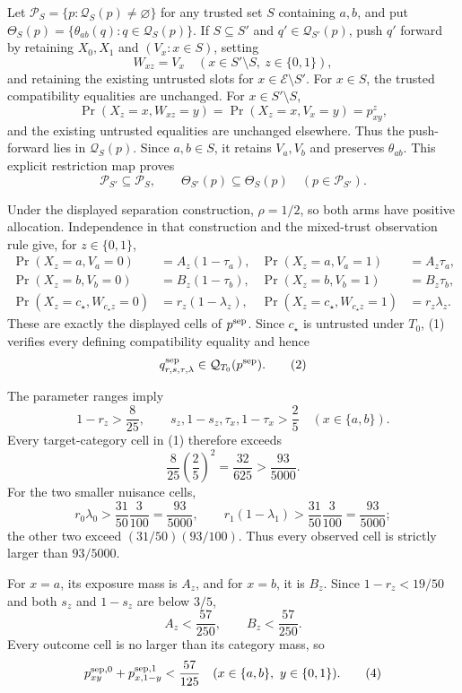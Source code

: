 Let \(\mathcal P_S=\{p:\mathcal Q_S(p)\ne\varnothing\}\) for any trusted
set \(S\) containing \(a,b\), and put
\(\Theta_S(p)=\{\theta_{ab}(q):q\in\mathcal Q_S(p)\}\).  If
\(S\subseteq S'\) and \(q'\in\mathcal Q_{S'}(p)\), push \(q'\) forward by
retaining \(X_0,X_1\) and \((V_x:x\in S)\), setting
\[
 W_{xz}=V_x\quad(x\in S'\setminus S,\ z\in\{0,1\}),
\]
and retaining the existing untrusted slots for
\(x\in\mathcal E\setminus S'\).  For \(x\in S\), the trusted compatibility
equalities are unchanged.  For \(x\in S'\setminus S\),
\[
 \Pr(X_z=x,W_{xz}=y)=\Pr(X_z=x,V_x=y)=p^z_{xy},
\]
and the existing untrusted equalities are unchanged elsewhere.  Thus the
push-forward lies in \(\mathcal Q_S(p)\).  Since \(a,b\in S\), it retains
\(V_a,V_b\) and preserves \(\theta_{ab}\).  This explicit restriction map
proves
\[
 \mathcal P_{S'}\subseteq\mathcal P_S,
 \qquad
 \Theta_{S'}(p)\subseteq\Theta_S(p)
 \quad(p\in\mathcal P_{S'}).
\]

Under the displayed separation construction,
\(\rho=1/2\), so both arms have positive allocation.  Independence in that
construction and the mixed-trust observation rule give, for
\(z\in\{0,1\}\),
\[
\begin{aligned}
 \Pr(X_z=a,V_a=0)&=A_z(1-\tau_a),&
 \Pr(X_z=a,V_a=1)&=A_z\tau_a,\\
 \Pr(X_z=b,V_b=0)&=B_z(1-\tau_b),&
 \Pr(X_z=b,V_b=1)&=B_z\tau_b,\\
 \Pr(X_z=c_\star,W_{c_\star z}=0)&=r_z(1-\lambda_z),&
 \Pr(X_z=c_\star,W_{c_\star z}=1)&=r_z\lambda_z.
\end{aligned} \tag{1}
\]
These are exactly the displayed cells of \(p^{\rm sep}\).  Since
\(c_\star\) is untrusted under \(T_0\), (1) verifies every defining
compatibility equality and hence
\[
 q^{\rm sep}_{r,s,\tau,\lambda}\in\mathcal Q_{T_0}(p^{\rm sep}). \tag{2}
\]

The parameter ranges imply
\[
 1-r_z>\frac8{25},
 \qquad s_z,1-s_z,\tau_x,1-\tau_x>\frac25
 \quad(x\in\{a,b\}).
\]
Every target-category cell in (1) therefore exceeds
\[
 \frac8{25}\left(\frac25\right)^2
 =\frac{32}{625}>\frac{93}{5000}. \tag{3}
\]
For the two smaller nuisance cells,
\[
 r_0\lambda_0>\frac{31}{50}\frac3{100}=\frac{93}{5000},
 \qquad
 r_1(1-\lambda_1)>\frac{31}{50}\frac3{100}=\frac{93}{5000};
\]
the other two exceed \((31/50)(93/100)\).  Thus every observed cell is
strictly larger than \(93/5000\).

For \(x=a\), its exposure mass is \(A_z\), and for \(x=b\), it is \(B_z\).
Since \(1-r_z<19/50\) and both \(s_z\) and \(1-s_z\) are below \(3/5\),
\[
 A_z<\frac{57}{250},\qquad B_z<\frac{57}{250}.
\]
Every outcome cell is no larger than its category mass, so
\[
 p^{{\rm sep},0}_{xy}+p^{{\rm sep},1}_{x,1-y}
 <\frac{57}{125}
 \quad(x\in\{a,b\},\ y\in\{0,1\}). \tag{4}
\]


